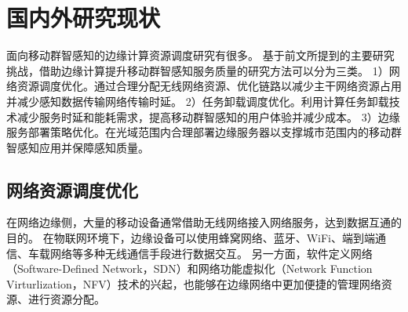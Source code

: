 








\section{国内外研究现状}

面向移动群智感知的边缘计算资源调度研究有很多。
基于前文所提到的主要研究挑战，借助边缘计算提升移动群智感知服务质量的研究方法可以分为三类。
1）网络资源调度优化。通过合理分配无线网络资源、优化链路以减少主干网络资源占用并减少感知数据传输网络传输时延。
2）任务卸载调度优化。利用计算任务卸载技术减少服务时延和能耗需求，提高移动群智感知的用户体验并减少成本。
3）边缘服务部署策略优化。在光域范围内合理部署边缘服务器以支撑城市范围内的移动群智感知应用并保障感知质量。

\subsection{网络资源调度优化}

在网络边缘侧，大量的移动设备通常借助无线网络接入网络服务，达到数据互通的目的。
在物联网环境下，边缘设备可以使用蜂窝网络、蓝牙、WiFi、端到端通信、车载网络等多种无线通信手段进行数据交互。
另一方面，软件定义网络（Software-Defined Network，SDN）和网络功能虚拟化（Network Function Virturlization，NFV）技术的兴起，也能够在边缘网络中更加便捷的管理网络资源、进行资源分配。

